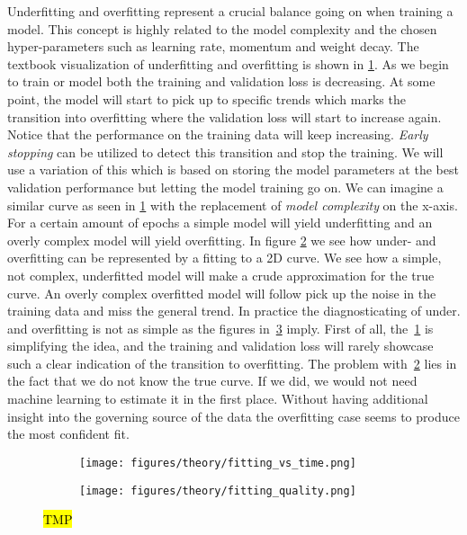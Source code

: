 Underfitting and overfitting represent a crucial balance going on when training
a model. This concept is highly related to the model complexity and the chosen
hyper-parameters such as learning rate, momentum and weight decay. The textbook
visualization of underfitting and overfitting is shown in
\cref{fig:fitting_vs_time}. As we begin to train or model both the training and
validation loss is decreasing. At some point, the model will start to pick up to
specific trends which marks the transition into overfitting where the validation
loss will start to increase again. Notice that the performance on the training
data will keep increasing.  \textit{Early stopping} can be utilized to detect
this transition and stop the training. We will use a variation of this which is
based on storing the model parameters at the best validation performance but
letting the model training go on. We can imagine a similar curve as seen in
\cref{fig:fitting_vs_time} with the replacement of \textit{model complexity} on
the x-axis. For a certain amount of epochs a simple model will yield
underfitting and an overly complex model will yield overfitting. In figure
\cref{fig:fitting_quality} we see how under- and overfitting can be represented
by a fitting to a 2D curve. We see how a simple, not complex, underfitted model
will make a crude approximation for the true curve. An overly complex
overfitted model will follow pick up the noise in the training data and miss the
general trend. In practice the diagnosticating of under. and overfitting is not
as simple as the figures in~\cref{fig:over_under_fitting} imply. First of all,
the~\cref{fig:fitting_vs_time} is simplifying the idea, and the training and
validation loss will rarely showcase such a clear indication of the transition
to overfitting. The problem with~\cref{fig:fitting_quality} lies in the fact
that we do not know the true curve. If we did, we would not need machine
learning to estimate it in the first place. Without having additional insight into
the governing source of the data the overfitting case seems to produce the most
confident fit.


\begin{figure}[H]
  \centering
  \begin{subfigure}[t]{0.42\textwidth}
    \centering
    \texttt{[image: figures/theory/fitting\_vs\_time.png]}
    \caption{}
    \label{fig:fitting_vs_time}
  \end{subfigure}
  \hfill
  \begin{subfigure}[t]{0.57\textwidth}
    \centering
    \texttt{[image: figures/theory/fitting\_quality.png]}
    \caption{}
    \label{fig:fitting_quality}
  \end{subfigure}
  \hfill
  \caption{\hl{TMP}}
  \label{fig:over_under_fitting}
\end{figure}



